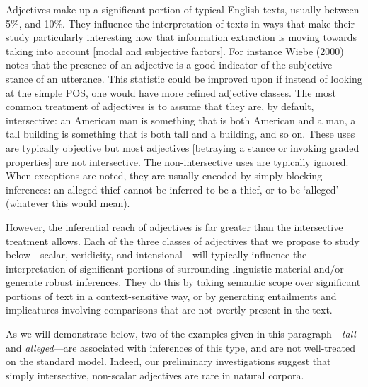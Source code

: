 \documentclass[10pt]{article}
\begin{document}
Adjectives make up a significant portion of typical English texts, usually between 5\%, and 10\%.  They influence the interpretation of texts in ways that make their study particularly interesting now that information extraction is moving towards taking into account [modal and subjective factors]. For instance Wiebe (2000) notes that the presence of an adjective is a good indicator of the subjective stance of an utterance. This statistic could be improved upon if instead of looking at the simple POS, one would have more refined adjective classes. The most common treatment of adjectives is to assume that they are, by default, intersective: an American man is something that is both American and a man, a tall building is something that is both tall and a building, and so on.  These uses are typically objective but most adjectives [betraying a stance or invoking graded properties] are not intersective. The non-intersective uses are typically ignored. When exceptions are noted, they are usually encoded by simply blocking inferences: an alleged thief cannot be inferred to be a thief, or to be `alleged' (whatever this would mean). 


However, the inferential reach of adjectives is far greater than the intersective treatment allows. Each of the three classes of adjectives that we propose to study below---scalar, veridicity, and intensional---will typically influence the interpretation of significant portions of surrounding linguistic material and/or generate robust inferences. They do this by taking semantic scope over significant portions of text in a context-sensitive way, or by generating entailments and implicatures involving comparisons that are not overtly present in the text. 

As we will demonstrate below, two of the examples given in this paragraph---\emph{tall} and \emph{alleged}---are associated with inferences of this type, and are not well-treated on the standard model. Indeed, our preliminary investigations suggest that simply intersective, non-scalar adjectives are rare in natural corpora.
\end{document}
